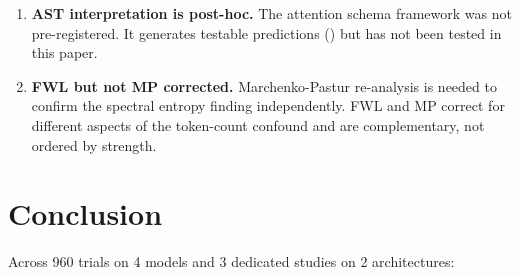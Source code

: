 \documentclass[11pt,a4paper]{article}
\begin{document}
\begin{enumerate}
    \item \textbf{AST interpretation is post-hoc.} The attention schema framework was not pre-registered. It generates testable predictions () but has not been tested in this paper.

    \item \textbf{FWL but not MP corrected.} Marchenko-Pastur re-analysis is needed to confirm the spectral entropy finding independently. FWL and MP correct for different aspects of the token-count confound and are complementary, not ordered by strength.
\end{enumerate}

\section{Conclusion}

Across 960 trials on 4 models and 3 dedicated studies on 2 architectures:
\end{document}
